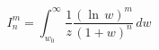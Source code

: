 \begin{equation}
I_{n}^{m}=\int_{w_{0}}^{\infty }\frac{1}{z}\frac{(\ln
\,w)^{m}}{(1+w)^{n}} \,dw  \label{Imn}
\end{equation}

